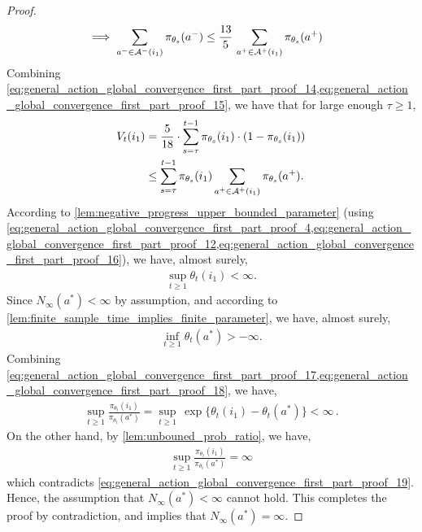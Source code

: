 \begin{proof}
\begin{align}
\implies \sum_{a^- \in {\mathcal{A}}^-(i_1)} \pi_{\theta_s}(a^-)  & \leq  \frac{13}{5} \, \sum_{a^+ \in {\mathcal{A}}^+(i_1)} \pi_{\theta_s}(a^+)  \label{eq:general_action_global_convergence_first_part_proof_15}
\end{align}
Combining \cref{eq:general_action_global_convergence_first_part_proof_14,eq:general_action_global_convergence_first_part_proof_15}, we have that for large enough $\tau \geq 1$, 
\begin{align}
    V_t(i_1) &= \frac{5}{18} \cdot \sum_{s=\tau}^{t-1}  \pi_{\theta_s}(i_1) \cdot (1-\pi_{\theta_s}(i_1)) \\
    &\le \sum_{s=\tau}^{t-1}  \pi_{\theta_s}(i_1) \sum_{a^+ \in {\mathcal{A}}^+(i_1)}{ \pi_{\theta_s}(a^+) }. \label{eq:general_action_global_convergence_first_part_proof_16}
\end{align}
According to \cref{lem:negative_progress_upper_bounded_parameter} (using \cref{eq:general_action_global_convergence_first_part_proof_4,eq:general_action_global_convergence_first_part_proof_12,eq:general_action_global_convergence_first_part_proof_16}), we have, almost surely,
\begin{align}
\label{eq:general_action_global_convergence_first_part_proof_17}
    \sup_{t \ge 1}{ \theta_t(i_1) } < \infty.
\end{align}
Since $N_\infty(a^*) < \infty$ by assumption, and according to \cref{lem:finite_sample_time_implies_finite_parameter}, we have, almost surely, 
\begin{align}
\label{eq:general_action_global_convergence_first_part_proof_18}
    \inf_{t \ge 1}{ \theta_t(a^*)} > -\infty.
\end{align}
Combining \cref{eq:general_action_global_convergence_first_part_proof_17,eq:general_action_global_convergence_first_part_proof_18}, we have,
\begin{align}
\label{eq:general_action_global_convergence_first_part_proof_19}
    \sup_{t \ge 1}{ \frac{\pi_{\theta_t}(i_1)}{\pi_{\theta_t}(a^*)} } = \sup_{t \ge 1} \, \exp\{ \theta_t(i_1) - \theta_t(a^*) \}  < \infty \,.
\end{align}
On the other hand, by \cref{lem:unbouned_prob_ratio}, we have,
\begin{align}
\label{eq:general_action_global_convergence_first_part_proof_20}
    \sup_{t \ge 1}{ \frac{\pi_{\theta_t}(i_1)}{\pi_{\theta_t}(a^*)} } = \infty
\end{align}
which contradicts \cref{eq:general_action_global_convergence_first_part_proof_19}. Hence, the assumption that $N_\infty(a^*) < \infty$ cannot hold. This completes the proof by contradiction, and implies that $N_\infty(a^*) = \infty$. 


\end{proof}
